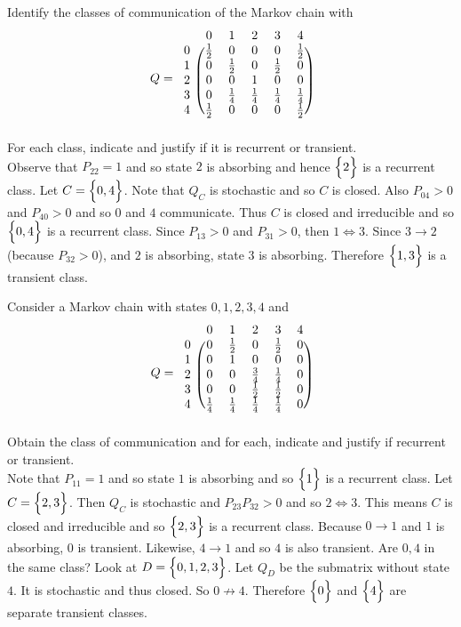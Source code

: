 \documentclass[12pt]{article}
\begin{document}
\begin{question} Identify the classes of communication of the Markov chain with $$ Q =  \begin{blockarray}{cccccc}
&0&1&2&3&4 \\
\begin{block}{c(ccccc)}
0 & \frac{1}{2} & 0 & 0 & 0 & \frac{1}{2}  \\
1 & 0 & \frac{1}{2} & 0 & \frac{1}{2} & 0 \\ 
2 & 0 & 0 & 1  & 0 & 0 \\ 
3 & 0 & \frac{1}{4} & \frac{1}{4} & \frac{1}{4} & \frac{1}{4} \\ 
4 & \frac{1}{2} & 0 & 0 & 0 & \frac{1}{2}  \\  \end{block} \end{blockarray} $$
For each class, indicate and justify if it is recurrent or transient.  \\
Observe that $P_{22} = 1$ and so state $2$ is absorbing and hence $\Big\{ 2 \Big\}$ is a recurrent class. Let $C = \Big\{ 0,4 \Big\}$. Note that $Q_C$ is stochastic and so $C$ is closed. Also $P_{04} > 0$ and $P_{40} > 0$ and so $0$ and $4$ communicate. Thus $C$ is closed and irreducible and so $\Big\{ 0,4 \Big\}$ is a recurrent class. Since $P_{13} > 0$ and $P_{31} > 0$, then $1 \iff 3$. Since $3 \to 2$ (because $P_{32} > 0$), and $2$ is absorbing, state $3$ is absorbing. Therefore $\Big\{ 1,3 \Big\}$ is a  transient class. 

\end{question} 

\begin{question} Consider a Markov chain with states $0,1,2,3,4$ and $$ Q =  \begin{blockarray}{cccccc}
&0&1&2&3&4 \\
\begin{block}{c(ccccc)}
0 & 0 & \frac{1}{2} & 0 & \frac{1}{2} & 0  \\
1 & 0 & 1 & 0 & 0 & 0 \\ 
2 & 0 & 0 & \frac{3}{4} & \frac{1}{4} & 0 \\ 
3 & 0 & 0 & \frac{1}{2} & \frac{1}{2} & 0 \\ 
4 & \frac{1}{4} & \frac{1}{4} & \frac{1}{4} & \frac{1}{4} & 0 \\  \end{block} \end{blockarray} $$
Obtain the class of communication and for each, indicate and justify if recurrent or transient.  \\
Note that $P_{11} = 1$ and so state $1$ is absorbing and so $\Big\{ 1 \Big\}$ is a recurrent class. Let $C = \Big\{ 2,3 \Big\}$. Then $Q_C$ is stochastic and $P_{23}P_{32} > 0$ and so $2 \iff 3$. This means $C$ is closed and irreducible and so $\Big\{ 2,3 \Big\}$ is a recurrent class. Because $0\to1$ and $1$ is absorbing, $0$ is transient. Likewise, $4\to1$ and so $4$ is also transient. Are $0,4$ in the same class? Look at $D = \Big\{ 0,1,2,3 \Big\}$. Let $Q_D$ be the submatrix without state $4$. It is stochastic and thus closed. So $0\not\to4$. Therefore $\Big\{ 0 \Big\}$ and $\Big\{ 4 \Big\}$ are separate transient classes.

\end{question}
\end{document}
